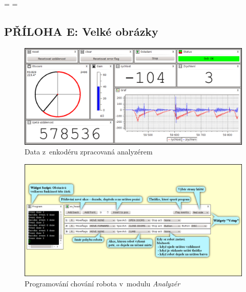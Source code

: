 \documentclass[12pt, a4paper, oneside]{article}
\newcommand{\It}{\textit}  %
\begin{document}
\newpage
\pagestyle{empty}
\textheight=\paperheight
\textwidth=\paperwidth
\voffset=-130pt
\begin{landscape}

\begin{center}
\section*{PŘÍLOHA E: Velké obrázky}
\end{center}

\begin{figure}[h]
\begin{center}
\includegraphics{img/enc_full.png}
\caption{Data z~enkodéru zpracovaná analyzérem}
\label{analyzer_all}
\end{center}
\end{figure}

\newpage
\begin{figure}[h]
\begin{center}
\includegraphics[width=750pt]{img/control_david.png}
\caption{Programování chování robota v~modulu \It{Analyzér}}
\label{david_ctrl}
\end{center}
\end{figure}
\end{landscape}
\end{document}

